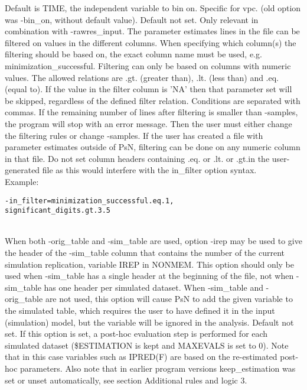 \begin{optionlist}
\nextopt
{}
Default is TIME, the independent variable to bin on. Specific for vpc. (old  option was -bin\_on, without default value). 
\nextopt
{}
Default not set. Only relevant in combination with -rawres\_input. The parameter estimates lines in the file can be filtered on values in the different columns. When specifying which column(s) the filtering should be based on, the exact column name must be used, e.g. minimization\_successful. Filtering can only be based on columns with numeric values. The allowed relations are .gt. (greater than), .lt. (less than) and .eq. (equal to). If the value in the filter column is 'NA' then that parameter set will be skipped, regardless of the defined filter relation. Conditions are separated with commas. 
If the remaining number of lines after filtering is smaller than -samples, the program will stop with an error message. Then the user must either change the filtering rules or change -samples. If the user has created a file with parameter estimates outside 
of PsN, filtering can be done on any numeric column in that file. Do not set column headers containing .eq. or .lt. or .gt.in the 
user-generated file as this would interfere with the in\_filter option syntax.\\
Example:
\begin{verbatim}
-in_filter=minimization_successful.eq.1,
significant_digits.gt.3.5
\end{verbatim} \\
\nextopt
{}
When both -orig\_table and -sim\_table are used, option -irep may be used to give the header of the -sim\_table column 
that contains the number of the current simulation replication, variable IREP in NONMEM. This option should only be used
when -sim\_table has a single header at the beginning of the file, not when -sim\_table has one header per simulated dataset.
When -sim\_table and -orig\_table are not used, this option will cause PsN to add the given variable to the simulated table,
which requires the user to have defined it in the input (simulation) model, but the variable will be ignored in the analysis.
\nextopt
{}
Default not set. If this option is set, a post-hoc evaluation step is performed for each simulated dataset (\mbox{\$ESTIMATION} is kept and MAXEVALS is set to 0). Note that in this case variables such as IPRED(F) are based on the re-estimated post-hoc parameters. Also note that in earlier program versions keep\_estimation was set or unset automatically, see section Additional rules and logic 3.\\

\end{optionlist}
